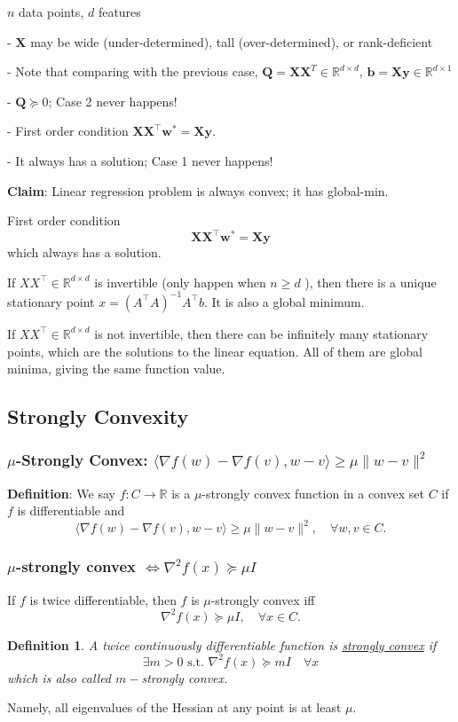 \documentclass[11pt,a4paper]{article}
\newtheorem{definition}{Definition}
\begin{document}
$n$ data points, $d$ features

- $\mathbf{X}$ may be wide (under-determined), tall (over-determined), or rank-deficient

- Note that comparing with the previous case, $\mathbf{Q}=\mathbf{X X}^{T} \in \mathbb{R}^{d \times d}$, $\mathbf{b}=\mathbf{X} \mathbf{y} \in \mathbb{R}^{d \times 1}$

- $\mathbf{Q} \succeq 0$; Case 2 never happens!

- First order condition $\mathbf{X X}^{\top} \mathbf{w}^{*}=\mathbf{X} \mathbf{y}$.

\quad - It always has a solution; Case 1 never happens!

\textbf{Claim}: Linear regression problem is always convex; it has global-min.

First order condition
$$
\mathbf{X X}^{\top} \mathbf{w}^{*}=\mathbf{X} \mathbf{y}
$$
which always has a solution.

If $X X^{\top} \in \mathbb{R}^{d \times d}$ is invertible (only happen when $n \geq d$ ), then there is a unique stationary point $x=\left(A^{\top} A\right)^{-1} A^{\top} b$. It is also a global minimum.

If $X X^{\top} \in \mathbb{R}^{d \times d}$ is not invertible, then there can be infinitely many stationary points, which are the solutions to the linear equation.
All of them are global minima, giving the same function value.

\subsection{Strongly Convexity}
\subsubsection{$\mu$-Strongly Convex: $
\langle\nabla f(w)-\nabla f(v), w-v\rangle \geq \mu\|w-v\|^{2}$}
\textbf{Definition}: We say $f: C \rightarrow \mathbb{R}$ is a $\mu$-strongly convex function in a convex set $C$ if $f$ is differentiable and
$$
\langle\nabla f(w)-\nabla f(v), w-v\rangle \geq \mu\|w-v\|^{2}, \quad \forall w, v \in C .
$$
\subsubsection{$\mu$-strongly convex $\Leftrightarrow \nabla^{2} f(x) \succeq \mu I$}
If $f$ is twice differentiable, then $f$ is $\mu$-strongly convex iff
$$
\nabla^{2} f(x) \succeq \mu I, \quad \forall x \in C .
$$
\begin{definition}
    A twice continuously differentiable function is \underline{strongly convex} if $$\exists m>0\text{ s.t. }\nabla^2 f(x)\succeq mI\quad \forall x$$
    which is also called $m-$strongly convex.
\end{definition}
Namely, all eigenvalues of the Hessian at any point is at least $\mu$.
\end{document}

